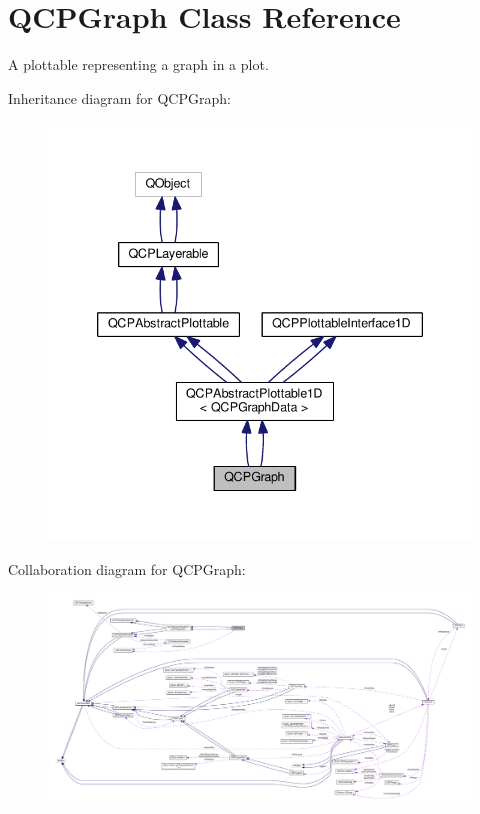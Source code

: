 \hypertarget{class_q_c_p_graph}{}\section{Q\+C\+P\+Graph Class Reference}
\label{class_q_c_p_graph}


A plottable representing a graph in a plot.  




Inheritance diagram for Q\+C\+P\+Graph\+:\nopagebreak
\begin{figure}[H]
\begin{center}
\leavevmode
\includegraphics[width=339pt]{class_q_c_p_graph__inherit__graph}
\end{center}
\end{figure}


Collaboration diagram for Q\+C\+P\+Graph\+:\nopagebreak
\begin{figure}[H]
\begin{center}
\leavevmode
\includegraphics[width=350pt]{class_q_c_p_graph__coll__graph}
\end{center}
\end{figure}
